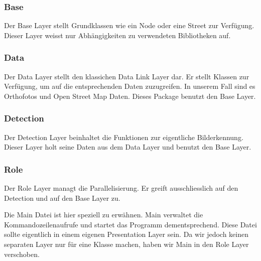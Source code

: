 \subsubsection{Base}
Der Base Layer stellt Grundklassen wie ein Node oder eine Street zur Verfügung. Dieser Layer weisst nur Abhängigkeiten zu verwendeten Bibliotheken auf.

\subsubsection{Data}
Der Data Layer stellt den klassichen Data Link Layer dar. Er stellt Klassen zur Verfügung, um auf die entsprechenden Daten zuzugreifen. In unserem Fall sind es Orthofotos und Open Street Map Daten. Dieses Package benutzt den Base Layer.

\subsubsection{Detection}
Der Detection Layer beinhaltet die Funktionen zur eigentliche Bilderkennung. Dieser Layer holt seine Daten aus dem Data Layer und benutzt den Base Layer.

\subsubsection{Role}
Der Role Layer managt die Parallelisierung. Er greift ausschliesslich auf den Detection und auf den Base Layer zu. 

Die Main Datei ist hier speziell zu erwähnen. Main verwaltet die Kommandozeilenaufrufe und startet das Programm dementsprechend. Diese Datei sollte eigentlich in einem eigenen Presentation Layer sein. Da wir jedoch keinen separaten Layer nur für eine Klasse machen, haben wir Main in den Role Layer verschoben.
